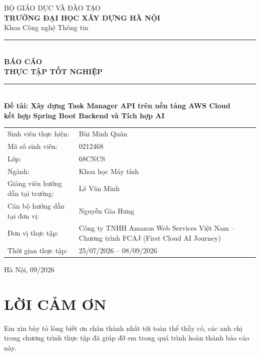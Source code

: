 \documentclass[13pt]{extarticle}
\newcommand{\hoTenSV}{Bùi Minh Quân}
\newcommand{\maSV}{0212468}
\newcommand{\lopSV}{68CNCS}
\newcommand{\nganhSV}{Khoa học Máy tính}
\newcommand{\khoaVien}{Khoa Công nghệ Thông tin}
\newcommand{\gvhd}{Lê Văn Minh}
\newcommand{\mentorCT}{Nguyễn Gia Hưng}
\newcommand{\donViThucTap}{Công ty TNHH Amazon Web Services Việt Nam -- Chương trình FCAJ (First Cloud AI Journey)}
\newcommand{\thoiGianTT}{25/07/2026 -- 08/09/2026}
\begin{document}
\begin{titlepage}
\centering
{\large BỘ GIÁO DỤC VÀ ĐÀO TẠO}\\
{\large\bfseries TRƯỜNG ĐẠI HỌC XÂY DỰNG HÀ NỘI}\\[0.3cm]
{\large \khoaVien}\\[2cm]

\rule{\linewidth}{0.5mm}\\[0.4cm]
{\huge\bfseries BÁO CÁO}\\[0.3cm]
{\Large\bfseries THỰC TẬP TỐT NGHIỆP}\\[0.4cm]
\rule{\linewidth}{0.5mm}\\[1cm]

{\large\bfseries Đề tài: Xây dựng Task Manager API trên nền tảng AWS Cloud\\ kết hợp Spring Boot Backend và Tích hợp AI}\\[2cm]

\begin{flushleft}
\large
\begin{tabular}{ll}
Sinh viên thực hiện: & \hoTenSV \\[0.2cm]
Mã số sinh viên: & \maSV \\[0.2cm]
Lớp: & \lopSV \\[0.2cm]
Ngành: & \nganhSV \\[0.2cm]
Giảng viên hướng dẫn tại trường: & \gvhd \\[0.2cm]
Cán bộ hướng dẫn tại đơn vị: & \mentorCT \\[0.2cm]
Đơn vị thực tập: & \donViThucTap \\[0.2cm]
Thời gian thực tập: & \thoiGianTT \\
\end{tabular}
\end{flushleft}

\vfill
{\large Hà Nội, 09/2026}

\end{titlepage}

\section*{LỜI CẢM ƠN}

Em xin bày tỏ lòng biết ơn chân thành nhất tới toàn thể thầy cô, các anh chị trong
chương trình thực tập đã giúp đỡ em trong quá trình hoàn thành báo cáo này.
\end{document}
